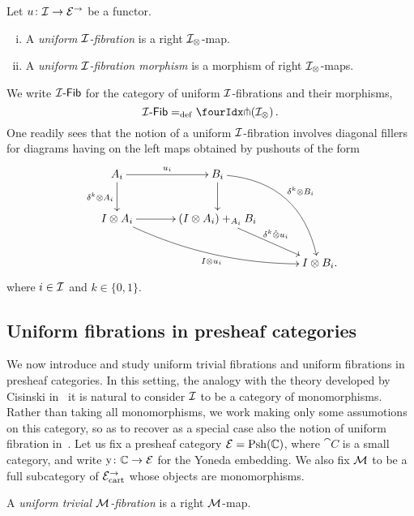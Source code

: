\documentclass[reqno,10pt,a4paper,oneside,draft]{amsart}
\begin{document}
\begin{definition} \label{def:I-fibration}
Let $u \co \cal{I} \to \catE^\to$ be a functor.
\begin{enumerate}[(i)]
\item A \emph{uniform $\cal{I}$-fibration} is a right $\cal{I}_\otimes$-map.
\item A \emph{uniform $\cal{I}$-fibration morphism} is a morphism of right $\cal{I}_\otimes$-maps.
\end{enumerate}
\end{definition}

We write $\Fib{\cal{I}}$ for the category of uniform $\cal{I}$-fibrations and their morphisms, \ie
\[
  \Fib{\cal{I}} \defeq \liftr{(\cal{I}_\otimes)} \, .
\]
One readily sees that the notion of a uniform $\cal{I}$-fibration involves diagonal fillers for diagrams having on the left maps obtained by pushouts of the form
\begin{gather*}
\xymatrix@C=1.2cm{
  A_i
  \ar[r]^{u_i}
  \ar[d]_{\kcyl \otimes A_i}
&
  B_i
  \ar@/^2pc/[ddr]^{\kcyl \otimes B_i}
  \ar[d]
&\\
  \interval \otimes A_i
  \ar@/_1pc/[drr]_{\interval \otimes u_i}
  \ar[r]
&
  (\interval \otimes A_i) +_{A_i} B_i
  \ar[dr]^-{\delta^k \hatotimes u_i}
&\\&&
  \interval \otimes B_i
\rlap{.}}
\end{gather*}
where $i \in \cal{I}$ and $k \in \{0, 1 \}$.


\subsection*{Uniform fibrations in presheaf categories} 


We now introduce and study uniform trivial fibrations and uniform fibrations in presheaf categories. In this setting, the analogy with the theory developed by Cisinski in~\cite{cisinski-asterisque} it is 
natural to consider $\cal{I}$ to be a category of monomorphisms. Rather than taking all monomorphisms, we work making only some assumotions on this category, so as to recover
as a special case also the notion of uniform fibration in~\cite{cohen-et-al:cubicaltt}. 
Let us fix a presheaf category $\catE = \Psh(\cat{C})$, where $\cat{C}$ is a small category, and
write $\yon \co \catC \to \catE$ for the Yoneda embedding. We also fix $\cal{M}$ to be a full subcategory of $\catE_\cart^\to$ whose objects are monomorphisms.



\begin{definition} \label{exa-triv-kan-fib}
A \emph{uniform trivial $\cal{M}$-fibration} is a  right $\cal{M}$-map. 
\end{definition}
\end{document}
